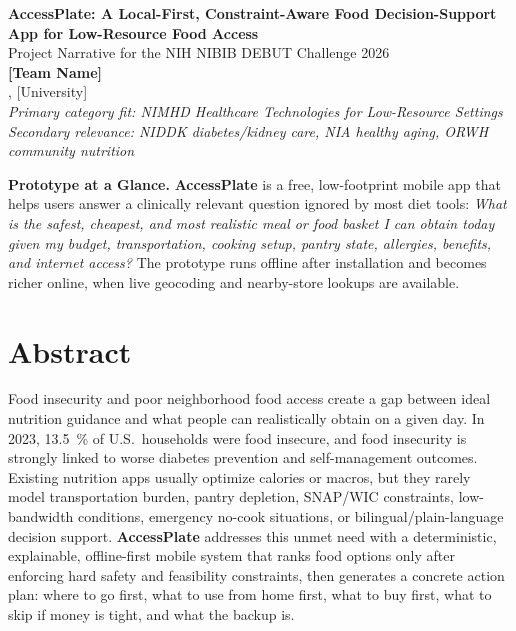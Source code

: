 \documentclass[11pt,letterpaper]{article}
\newcommand{\app}{\textbf{AccessPlate}}
\begin{document}
\begin{center}
{\LARGE \textbf{AccessPlate: A Local-First, Constraint-Aware Food Decision-Support App for Low-Resource Food Access}}\\[4pt]
{\large Project Narrative for the NIH NIBIB DEBUT Challenge 2026}\\[5pt]
\textbf{[Team Name]}\\
[Department], [University]\\[3pt]
\textit{Primary category fit: NIMHD Healthcare Technologies for Low-Resource Settings}\\
\textit{Secondary relevance: NIDDK diabetes/kidney care, NIA healthy aging, ORWH community nutrition}
\end{center}

\begin{center}
\colorbox{aplight}{%
\parbox{0.97\linewidth}{%
\textbf{Prototype at a Glance.}
\app{} is a free, low-footprint mobile app that helps users answer a clinically relevant question ignored by most diet tools:
\emph{What is the safest, cheapest, and most realistic meal or food basket I can obtain today given my budget, transportation, cooking setup, pantry state, allergies, benefits, and internet access?}
The prototype runs offline after installation and becomes richer online, when live geocoding and nearby-store lookups are available.}}
\end{center}

\section*{Abstract}
Food insecurity and poor neighborhood food access create a gap between ideal nutrition guidance and what people can realistically obtain on a given day. In 2023, \SI{13.5}{\percent} of U.S.\ households were food insecure, and food insecurity is strongly linked to worse diabetes prevention and self-management outcomes.\cite{usda_food_security_2023,cdc_food_insecurity_diabetes} Existing nutrition apps usually optimize calories or macros, but they rarely model transportation burden, pantry depletion, SNAP/WIC constraints, low-bandwidth conditions, emergency no-cook situations, or bilingual/plain-language decision support. \app{} addresses this unmet need with a deterministic, explainable, offline-first mobile system that ranks food options only after enforcing hard safety and feasibility constraints, then generates a concrete action plan: where to go first, what to use from home first, what to buy first, what to skip if money is tight, and what the backup is.
\end{document}
